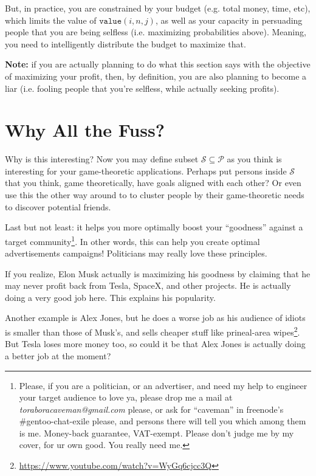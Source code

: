 \documentclass{report}
\begin{document}
But, in practice, you are constrained by your budget (e.g. total money,
time, etc), which limits the value of $\texttt{value}(i,n,j)$, as well as your
capacity in persuading people that you are being selfless (i.e. maximizing
probabilities above). Meaning, you need to intelligently distribute the budget
to maximize that. 

\textbf{Note:} if you are actually planning to do what this section says with
the objective of maximizing your profit, then, by definition, you are also
planning to become a liar (i.e. fooling people that you're selfless, while
actually seeking profits).

\section{Why All the Fuss?}
Why is this interesting? Now you may define subset $\mathcal{S} \subseteq
\mathcal{P}$ as you think
is interesting for your game-theoretic applications. Perhaps put persons inside
$\mathcal{S}$ that you think, game theoretically, have goals aligned with each
other? Or even use this the other way around to to cluster people by their
game-theoretic needs to discover potential friends.

Last but not least: it helps you more optimally boost your ``goodness'' against a
target community\footnote{Please, if you are a politician, or an advertiser,
and need my help to engineer your target audience to love ya, please drop me a
mail at \emph{toraboracaveman@gmail.com} please, or ask for ``caveman'' in
freenode's \#gentoo-chat-exile please, and persons there will tell you which
among them is me. Money-back guarantee, VAT-exempt. Please don't judge me by my cover, for
ur own good. You really need me.}. In other words, this can help you create
optimal advertisements campaigns! Politicians may really love these principles.

If you realize, Elon Musk actually is maximizing his goodness by claiming that
he may never profit back from Tesla, SpaceX, and other projects.  He is
actually doing a very good job here. This explains his popularity.

Another example is Alex Jones, but he does a worse job as his audience of
idiots is smaller than those of Musk's, and sells cheaper stuff like
prineal-area wipes\footnote{\url{https://www.youtube.com/watch?v=WyGq6cjcc3Q}}.
But Tesla loses more money too, so could it be that Alex Jones is actually
doing a better job at the moment?
\end{document}
